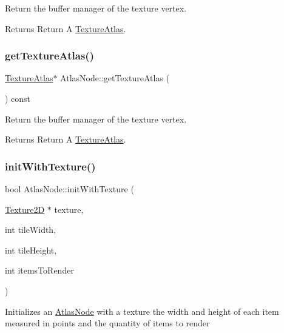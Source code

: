 Return the buffer manager of the texture vertex.

\begin{DoxyReturn}{Returns}
Return A \hyperlink{classTextureAtlas}{Texture\+Atlas}. 
\end{DoxyReturn}
\mbox{\label{classAtlasNode_ab383df8fe17243d03f86d47296d3bd33}} 
\subsubsection{\texorpdfstring{get\+Texture\+Atlas()}{getTextureAtlas()}\hspace{0.1cm}{\footnotesize\ttfamily [2/2]}}
{\footnotesize\ttfamily \hyperlink{classTextureAtlas}{Texture\+Atlas}$\ast$ Atlas\+Node\+::get\+Texture\+Atlas (\begin{DoxyParamCaption}{ }\end{DoxyParamCaption}) const}

Return the buffer manager of the texture vertex.

\begin{DoxyReturn}{Returns}
Return A \hyperlink{classTextureAtlas}{Texture\+Atlas}. 
\end{DoxyReturn}
\mbox{\label{classAtlasNode_a2d9f1166a53720d7ac48ab665c847604}} 
\subsubsection{\texorpdfstring{init\+With\+Texture()}{initWithTexture()}\hspace{0.1cm}{\footnotesize\ttfamily [1/2]}}
{\footnotesize\ttfamily bool Atlas\+Node\+::init\+With\+Texture (\begin{DoxyParamCaption}\item[{\hyperlink{classTexture2D}{Texture2D} $\ast$}]{texture,  }\item[{int}]{tile\+Width,  }\item[{int}]{tile\+Height,  }\item[{int}]{items\+To\+Render }\end{DoxyParamCaption})}

Initializes an \hyperlink{classAtlasNode}{Atlas\+Node} with a texture the width and height of each item measured in points and the quantity of items to render \mbox{\label{classAtlasNode_a2d9f1166a53720d7ac48ab665c847604}} 
